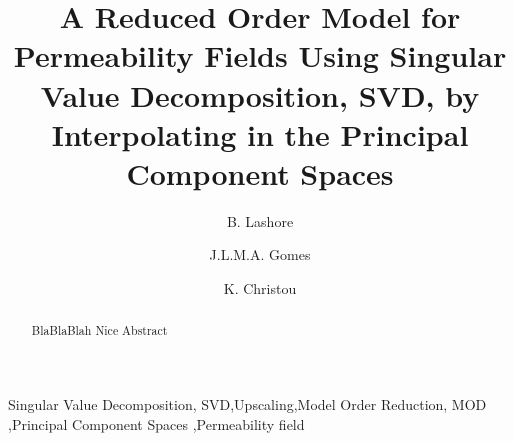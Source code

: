 \documentclass[preprint,12pt]{elsarticle}
\begin{document}
\begin{frontmatter}



\title{A Reduced Order Model for Permeability Fields Using Singular Value Decomposition, SVD, by Interpolating in the Principal Component Spaces}
\author[UoA]{B. Lashore} \author[UoA]{J.L.M.A. Gomes} \author[UoA]{K. Christou}
\address[UoA]{Mechanics of Fluids, Soils \& Structures Group, School of Engineering, University of Aberdeen, UK}


\begin{abstract}
  BlaBlaBlah Nice Abstract 
\end{abstract}



\begin{keyword} %
Singular Value Decomposition, SVD\sep Upscaling\sep Model Order Reduction, MOD \sep  Principal Component Spaces \sep Permeability field
\end{keyword}
 
\end{frontmatter}

\end{document}
